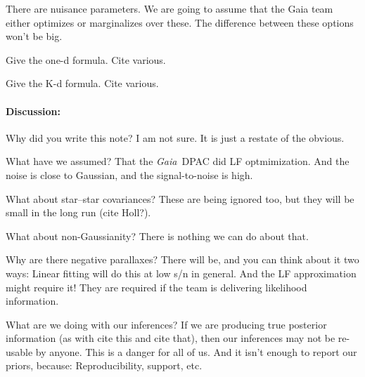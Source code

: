 \documentclass[12pt]{article}
\newcommand{\Gaia}{\textsl{Gaia}}
\begin{document}
There are nuisance parameters. We are going to assume that the Gaia team either
optimizes or marginalizes over these. The difference between these options won't
be big.

Give the one-d formula. Cite various.

Give the K-d formula. Cite various.

\paragraph{Discussion:}
Why did you write this note? I am not sure. It is just a restate of the
obvious.

What have we assumed? That the \Gaia\ DPAC did LF optmimization. And the
noise is close to Gaussian, and the signal-to-noise is high.

What about star--star covariances? These are being ignored too, but they
will be small in the long run (cite Holl?).

What about non-Gaussianity? There is nothing we can do about that.

Why are there negative parallaxes? There will be, and you can think about
it two ways: Linear fitting will do this at low s/n in general. And the
LF approximation might require it!
They are required if the team is delivering likelihood information.

What are we doing with our inferences? If we are producing true posterior
information (as with cite this and cite that), then our inferences may not
be re-usable by anyone. This is a danger for all of us. And it isn't enough
to report our priors, because: Reproducibility, support, etc.
\end{document}
